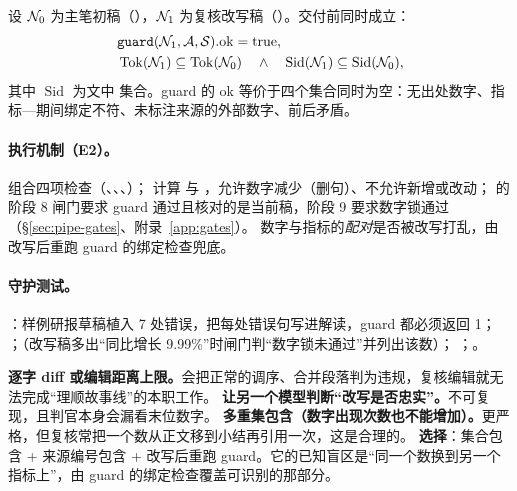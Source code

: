 \begin{invariant}[护栏与数字锁]\label{inv:pr-guard}
设 $\mathcal{N}_0$ 为主笔初稿（），$\mathcal{N}_1$ 为复核改写稿（）。交付前同时成立：
\begin{align}
  &\texttt{guard}(\mathcal{N}_1, \mathcal{A}, \mathcal{S}).\text{ok} = \text{true}, \label{eq:pr-guard}\\
  &\operatorname{Tok}(\mathcal{N}_1) \subseteq \operatorname{Tok}(\mathcal{N}_0) \quad\wedge\quad \operatorname{Sid}(\mathcal{N}_1)\subseteq\operatorname{Sid}(\mathcal{N}_0), \label{eq:pr-numlock}
\end{align}
其中 $\operatorname{Sid}$ 为文中 \code{[S编号]} 集合。guard 的 ok 等价于四个集合同时为空：无出处数字、指标—期间绑定不符、未标注来源的外部数字、前后矛盾。
\end{invariant}

\paragraph{执行机制（E2）。} 组合四项检查（、、、）；
 计算  与 ，允许数字减少（删句）、不允许新增或改动；
 的阶段 8 闸门要求 guard 通过且核对的是当前稿，阶段 9 要求数字锁通过（\S\ref{sec:pipe-gates}、附录~\ref{app:gates}）。
数字与指标的\emph{配对}是否被改写打乱，由改写后重跑 guard 的绑定检查兜底。

\paragraph{守护测试。}：样例研报草稿植入 7 处错误，把每处错误句写进解读，guard 都必须返回 1；
；（改写稿多出“同比增长 9.99\%”时闸门判“数字锁未通过”并列出该数）；
；。

\begin{tradeoff}[：数字锁的形式]
\textbf{逐字 diff 或编辑距离上限。}会把正常的调序、合并段落判为违规，复核编辑就无法完成“理顺故事线”的本职工作。
\textbf{让另一个模型判断“改写是否忠实”。}不可复现，且判官本身会漏看末位数字。
\textbf{多重集包含（数字出现次数也不能增加）。}更严格，但复核常把一个数从正文移到小结再引用一次，这是合理的。
\textbf{选择}：集合包含 + 来源编号包含 + 改写后重跑 guard。它的已知盲区是“同一个数换到另一个指标上”，由 guard 的绑定检查覆盖可识别的那部分。
\end{tradeoff}

